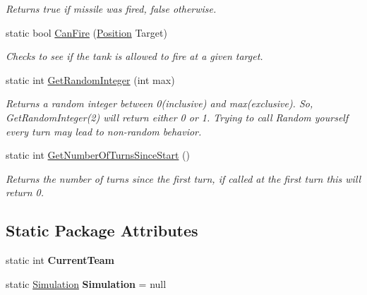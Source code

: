 \begin{DoxyCompactItemize}
\begin{DoxyCompactList}\small\item\em Returns true if missile was fired, false otherwise. \end{DoxyCompactList}\item 
\mbox{\label{class_n_g_a_p_i_1_1_a_p_i_a7303ec11776de1bdc2a3138a4d001bb5}} 
static bool \hyperlink{class_n_g_a_p_i_1_1_a_p_i_a7303ec11776de1bdc2a3138a4d001bb5}{Can\+Fire} (\hyperlink{struct_n_g_a_p_i_1_1_position}{Position} Target)
\begin{DoxyCompactList}\small\item\em Checks to see if the tank is allowed to fire at a given target. \end{DoxyCompactList}\item 
static int \hyperlink{class_n_g_a_p_i_1_1_a_p_i_a63cedf132a30d25da3b4aa8e7a0d16db}{Get\+Random\+Integer} (int max)
\begin{DoxyCompactList}\small\item\em Returns a random integer between 0(inclusive) and max(exclusive). So, Get\+Random\+Integer(2) will return either 0 or 1. Trying to call Random yourself every turn may lead to non-\/random behavior. \end{DoxyCompactList}\item 
static int \hyperlink{class_n_g_a_p_i_1_1_a_p_i_a541c8a9511350ce4983690e6492a6221}{Get\+Number\+Of\+Turns\+Since\+Start} ()
\begin{DoxyCompactList}\small\item\em Returns the number of turns since the first turn, if called at the first turn this will return 0. \end{DoxyCompactList}\end{DoxyCompactItemize}
\subsection*{Static Package Attributes}
\begin{DoxyCompactItemize}
\item 
\mbox{\label{class_n_g_a_p_i_1_1_a_p_i_a16dd1313ce5607ace2f090b6e5cc046a}} 
static int {\bfseries Current\+Team}
\item 
\mbox{\label{class_n_g_a_p_i_1_1_a_p_i_affe3bb76635624559ed0b534bd52ec14}} 
static \hyperlink{class_n_g_a_p_i_1_1_simulation}{Simulation} {\bfseries Simulation} = null
\end{DoxyCompactItemize}

